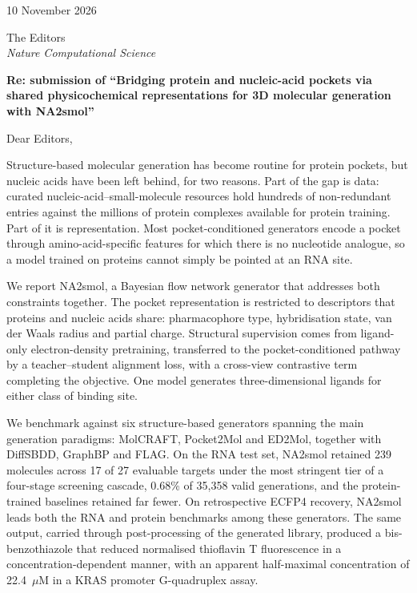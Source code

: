 \documentclass[10pt]{article}
\begin{document}
10 November 2026

\vspace{0.2em}
The Editors\\
\emph{Nature Computational Science}

\vspace{1.0em}
\textbf{Re: submission of ``Bridging protein and nucleic-acid pockets via shared physicochemical
representations for 3D molecular generation with NA2smol''}

\vspace{0.4em}
Dear Editors,

Structure-based molecular generation has become routine for protein pockets, but nucleic acids
have been left behind, for two reasons. Part of the gap is data: curated nucleic-acid--small-molecule
resources hold hundreds of non-redundant entries against the millions of protein complexes available
for protein training. Part of it is representation. Most pocket-conditioned generators encode a
pocket through amino-acid-specific features for which there is no nucleotide analogue, so a model
trained on proteins cannot simply be pointed at an RNA site.

We report NA2smol, a Bayesian flow network generator that addresses both constraints together.
The pocket representation is restricted to descriptors that proteins and nucleic acids share:
pharmacophore type, hybridisation state, van der Waals radius and partial charge. Structural
supervision comes from ligand-only electron-density pretraining, transferred to the
pocket-conditioned pathway by a teacher--student alignment loss, with a cross-view contrastive
term completing the objective. One model generates three-dimensional ligands for either class of
binding site.

We benchmark against six structure-based generators spanning the main generation paradigms:
MolCRAFT, Pocket2Mol and ED2Mol, together with DiffSBDD, GraphBP and FLAG. On the RNA test set,
NA2smol retained 239 molecules across 17 of 27 evaluable targets under the most stringent tier of
a four-stage screening cascade, 0.68\% of 35,358 valid generations, and the protein-trained
baselines retained far fewer. On retrospective ECFP4 recovery, NA2smol leads both the RNA and protein benchmarks among these generators. The
same output, carried through post-processing of the generated library, produced a
bis-benzothiazole that reduced normalised thioflavin T fluorescence in a concentration-dependent
manner, with an apparent half-maximal concentration of 22.4~$\mu$M in a KRAS promoter
G-quadruplex assay.
\end{document}
